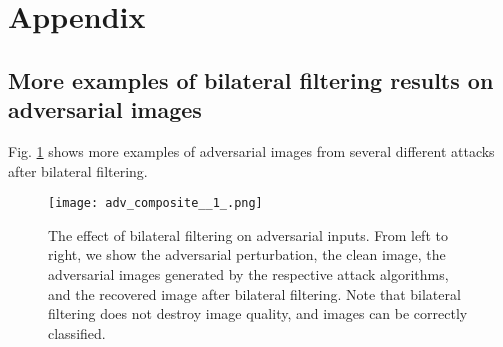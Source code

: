 \documentclass{article} %
\begin{document}




\newpage

\section{Appendix}
\subsection{More examples of bilateral filtering results on adversarial images}
Fig. \ref{fig:collection} shows more examples of adversarial images from several different attacks after bilateral filtering.
\begin{figure}[!ht]
\centering
\texttt{[image: adv\_composite\_\_1\_.png]}
\caption{The effect of bilateral filtering on adversarial inputs. From left to right, we show the adversarial perturbation, the clean image, the adversarial images generated by the respective attack algorithms, and the recovered image after bilateral filtering. Note that bilateral filtering does not destroy image quality, and images can be correctly classified. }
\label{fig:collection}
\end{figure}
\end{document}
